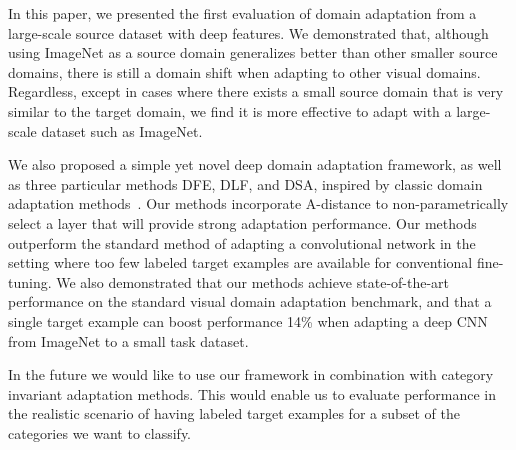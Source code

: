 In this paper, we presented the first evaluation of domain adaptation from a
large-scale source dataset with deep features. We demonstrated that, although
using ImageNet as a source domain generalizes better than other smaller source
domains, there is still a domain shift when adapting to other visual domains.
Regardless, except in cases where there exists a small source domain that is
very similar to the target domain, we find it is more effective to adapt with
a large-scale dataset such as ImageNet.

We also proposed a simple yet novel deep domain adaptation framework, as well as
three particular methods DFE, DLF, and DSA, inspired by classic domain
adaptation methods~\cite{daume, sa}. Our methods incorporate A-distance to
non-parametrically select a layer that will provide strong adaptation
performance. Our methods outperform the standard method of adapting a
convolutional network in the setting where too few labeled target examples are
available for conventional fine-tuning. We also demonstrated that our methods
achieve state-of-the-art performance on the standard visual domain adaptation
benchmark, and that a single target example can boost performance 14\% when
adapting a deep CNN from ImageNet to a small task dataset.

In the future we would like to use our framework in combination with category invariant adaptation methods. This would enable us to evaluate performance in the realistic scenario of having labeled target examples for a subset of the categories we want to classify. 
